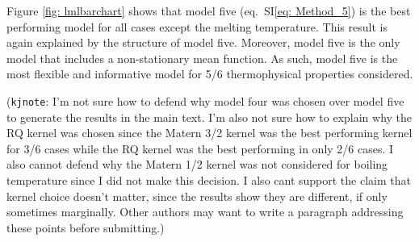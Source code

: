 \documentclass[journal=jacsat,manuscript=article, ]{achemso}
\newcommand{\kjnote}[1]{{\color{Blue} (\texttt{kjnote}: #1)}}
\newcommand{\siref}[1]{SI\eqref{#1}}
\begin{document}
Figure \ref{fig: lmlbarchart} shows that model five (eq.~\siref{eq: Method_5}) is the best performing model for all cases except the melting temperature. This result is again explained by the structure of model five. Moreover, model five is the only model that includes a non-stationary mean function. As such, model five is the most flexible and informative model for 5/6 thermophysical properties considered.

\kjnote{I'm not sure how to defend why model four was chosen over model five to generate the results in the main text. I'm also not sure how to explain why the RQ kernel was chosen since the Matern 3/2 kernel was the best performing kernel for 3/6 cases while the RQ kernel was the best performing in only 2/6 cases. I also cannot defend why the Matern 1/2 kernel was not considered for boiling temperature since I did not make this decision. I also cant support the claim that kernel choice doesn't matter, since the results show they are different, if only sometimes marginally. Other authors may want to write a paragraph addressing these points before submitting.}
\end{document}
